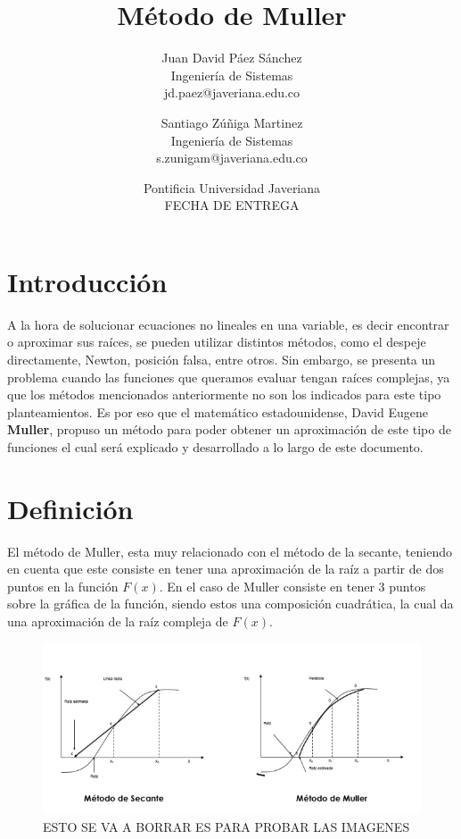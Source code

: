 \documentclass{article}
\title{\textbf{Método de Muller}}
\author{Juan David Páez Sánchez \\Ingeniería de Sistemas\\ jd.paez@javeriana.edu.co \and Santiago Zúñiga Martinez\\ Ingeniería de Sistemas\\ s.zunigam@javeriana.edu.co}
\date{Pontificia Universidad Javeriana\\FECHA DE ENTREGA}
\begin{document}
\maketitle

\section{Introducción}
A la hora de solucionar ecuaciones no lineales en una variable, 
es decir encontrar o aproximar sus raíces, se pueden utilizar 
distintos métodos, como el despeje directamente, Newton, posición falsa, 
entre otros. Sin embargo, se presenta un problema cuando las funciones que 
queramos evaluar tengan raíces complejas, ya que los métodos mencionados 
anteriormente no son los indicados para este tipo planteamientos. 
Es por eso que el matemático estadounidense, David Eugene \textbf{Muller}, 
propuso un método para poder obtener un aproximación de este tipo de 
funciones el cual será explicado y desarrollado a lo largo de este documento.
\
\section{Definición}
El método de Muller, esta muy relacionado con el método de la secante, 
teniendo en cuenta que este consiste en tener una aproximación de la 
raíz a partir de dos puntos en la función $F(x)$. En el caso de 
Muller consiste en tener 3 puntos sobre la gráfica de la función, 
siendo estos una composición cuadrática, la cual da una aproximación de la raíz compleja de $F(x)$.
\begin{figure}[h]
    \centering
        \includegraphics[scale=0.6]{Imagenes/MetodoSecanteYMuller.png}
        \caption{ESTO SE VA A BORRAR ES PARA PROBAR LAS IMAGENES}
    \label{fig:1}
\end{figure}
\end{document}
